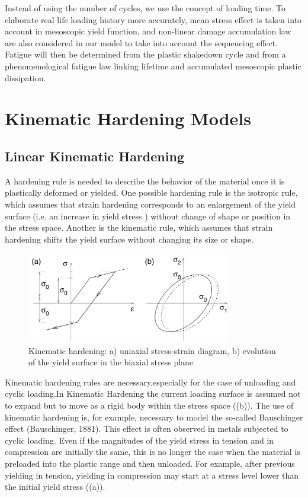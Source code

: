 Instead of using the number of cycles, we use the concept of loading time. To elaborate real life loading history more accurately, mean stress effect is taken into account in mesoscopic yield function, and non-linear damage accumulation law are also considered in our model to take into account the sequencing effect. Fatigue will then be determined from the plastic shakedown cycle and from a phenomenological fatigue law linking lifetime and accumulated mesoscopic plastic dissipation.

\section{Kinematic Hardening Models}
\subsection{Linear Kinematic Hardening}
A hardening rule is needed to
describe the behavior of the
material once it is plastically
deformed or yielded. One possible hardening rule is the
isotropic rule, which assumes
that strain hardening corresponds
to an enlargement of the yield
surface (i.e. an increase in  yield stress )
without change of shape or
position in the stress space. Another is the kinematic rule,
which assumes that strain
hardening shifts the yield surface
without changing its size or shape.
\begin{figure}[h!]
	\centering
	\includegraphics[width=0.8\textwidth]{figures//kinhard.png} 
	\caption{Kinematic hardening: a) uniaxial stress-strain diagram, b) evolution of the
		yield surface in the biaxial stress plane}
	\label{kinhard}
\end{figure}
Kinematic hardening rules are necessary,especially for the case of unloading and cyclic loading.In Kinematic Hardening the current loading surface is assumed not to expand but to move as a rigid body
within the stress space ((b)). The use
of kinematic hardening is, for example, necessary to model the so-called Bauschinger
effect (Bauschinger, 1881). This effect is often observed in metals subjected to cyclic
loading. Even if the magnitudes of the yield stress in tension and in compression
are initially the same, this is no longer the case when the material is preloaded into
the plastic range and then unloaded. For example, after previous yielding in tension,
yielding in compression may start at a stress level lower than the initial yield stress
((a)).

